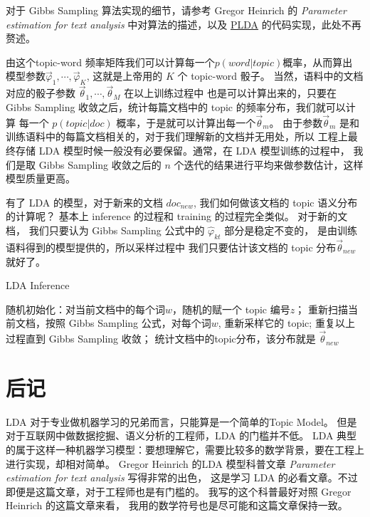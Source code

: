 对于 Gibbs Sampling 算法实现的细节，请参考 Gregor Heinrich 的 \emph{Parameter estimation for text analysis}
中对算法的描述，以及 \href{http://code.google.com/p/plda}{PLDA} 的代码实现，此处不再赘述。

由这个topic-word 频率矩阵我们可以计算每一个$p(word|topic)$概率，从而算出
模型参数$\vec{\varphi}_1, \cdots, \vec{\varphi}_K$, 这就是上帝用的 $K$ 个 topic-word 骰子。
当然，语料中的文档对应的骰子参数 $\vec{\theta}_1, \cdots, \vec{\theta}_M$ 在以上训练过程中
也是可以计算出来的，只要在 Gibbs Sampling 收敛之后，统计每篇文档中的 topic 的频率分布，我们就可以计算
每一个 $p(topic|doc)$ 概率，于是就可以计算出每一个$\vec{\theta}_m$。
由于参数$\vec{\theta}_m$ 是和训练语料中的每篇文档相关的，对于我们理解新的文档并无用处，所以
工程上最终存储 LDA 模型时候一般没有必要保留。通常，在 LDA 模型训练的过程中，
我们是取 Gibbs Sampling 收敛之后的 $n$ 个迭代的结果进行平均来做参数估计，这样模型质量更高。

有了 LDA 的模型，对于新来的文档 $doc_{new}$, 我们如何做该文档的 topic 语义分布的计算呢？
基本上 inference 的过程和 training 的过程完全类似。
对于新的文档， 我们只要认为 Gibbs Sampling 公式中的 $\hat{\varphi}_{kt}$ 部分是稳定不变的，
是由训练语料得到的模型提供的，所以采样过程中
我们只要估计该文档的 topic 分布$\vec{\theta}_{new}$就好了。

\begin{algorithm}[H]
\caption{LDA Inference}
\begin{algorithmic}[1]
\STATE 随机初始化：对当前文档中的每个词$w$，随机的赋一个 topic 编号$z$；
\STATE 重新扫描当前文档，按照 Gibbs Sampling 公式，对每个词$w$, 重新采样它的 topic;
\STATE 重复以上过程直到 Gibbs Sampling 收敛；
\STATE 统计文档中的topic分布，该分布就是 $\vec{\theta}_{new}$
\end{algorithmic}
\end{algorithm}


\section{后记}

LDA 对于专业做机器学习的兄弟而言，只能算是一个简单的Topic Model。
但是对于互联网中做数据挖掘、语义分析的工程师，LDA 的门槛并不低。
LDA 典型的属于这样一种机器学习模型：要想理解它，需要比较多的数学背景，要在工程上进行实现，却相对简单。
Gregor Heinrich 的LDA 模型科普文章 \emph{Parameter estimation for text analysis} 写得非常的出色，
这是学习 LDA 的必看文章。不过即便是这篇文章，对于工程师也是有门槛的。
我写的这个科普最好对照 Gregor Heinrich 的这篇文章来看， 我用的数学符号也是尽可能和这篇文章保持一致。


